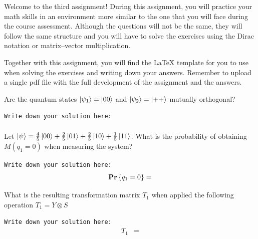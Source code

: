 Welcome to the third assignment! During this assignment, you will practice your
math skills in an environment more similar to the one that you will face during
the course assessment. Although the questions will not be the same, they will
follow the same structure and you will have to solve the exercises using the
Dirac notation or matrix--vector multiplication.

Together with this assignment, you will find the \LaTeX { template} for you to
use when solving the exercises and writing down your answers. Remember to
upload a single pdf file with the full development of the assignment and the
answers.

\begin{question}
Are the quantum states $\ket{\psi_{1}} = \ket{00}$ and $\ket{\psi_{2}} = \ket{++}$ mutually orthogonal?
\label{qst:assignment3_1}
\end{question}
{\small
\texttt{Write down your solution here:}
\begin{equation*}
  \begin{split}
  \end{split}
\end{equation*}}
\vspace{0.1cm}

\begin{question}
Let $\ket{\psi} = \frac{4}{5} \ket{00} + \frac{2}{5} \ket{01} + \frac{2}{5} \ket{10} + \frac{1}{5} \ket{11}$. What is the probability of obtaining $M(q_{1} = 0)$ when measuring the system?
\label{qst:assignment3_2}
\end{question}
{\small
\texttt{Write down your solution here:}
\begin{equation*}
  \begin{split}
    \mathbf{Pr}\left\{ q_{1} = 0 \right\} &=  \\
  \end{split}
\end{equation*}}
\vspace{0.1cm}

\begin{question}
What is the resulting transformation matrix $T_{1}$ when applied the following operation $T_{1} = Y \otimes S$
\label{qst:assignment3_3}
\end{question}
{\small
\texttt{Write down your solution here:}
\begin{equation*}
  \begin{split}
    T_{1} &=  \\
  \end{split}
\end{equation*}}
\vspace{0.1cm}

